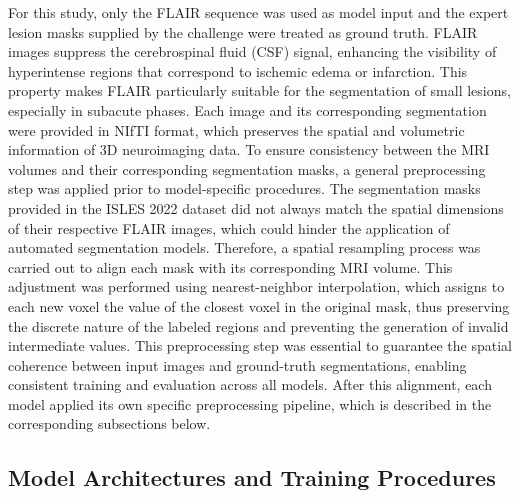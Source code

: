 \documentclass[12pt]{article}
\begin{document}
For this study, only the FLAIR sequence was used as model input and the expert lesion masks supplied by the challenge were treated as ground truth. FLAIR images suppress the cerebrospinal fluid (CSF) signal, enhancing the visibility of hyperintense regions that correspond to ischemic edema or infarction. This property makes FLAIR particularly suitable for the segmentation of small lesions, especially in subacute phases. Each image and its corresponding segmentation were provided in NIfTI format, which preserves the spatial and volumetric information of 3D neuroimaging data. To ensure consistency between the MRI volumes and their corresponding segmentation masks, a general preprocessing step was applied prior to model-specific procedures. The segmentation masks provided in the ISLES 2022 dataset did not always match the spatial dimensions of their respective FLAIR images, which could hinder the application of automated segmentation models. Therefore, a spatial resampling process was carried out to align each mask with its corresponding MRI volume. This adjustment was performed using nearest-neighbor interpolation, which assigns to each new voxel the value of the closest voxel in the original mask, thus preserving the discrete nature of the labeled regions and preventing the generation of invalid intermediate values. This preprocessing step was essential to guarantee the spatial coherence between input images and ground-truth segmentations, enabling consistent training and evaluation across all models. After this alignment, each model applied its own specific preprocessing pipeline, which is described in the corresponding subsections below.



\subsection{Model Architectures and Training Procedures} \label{subsec:models}
\end{document}
